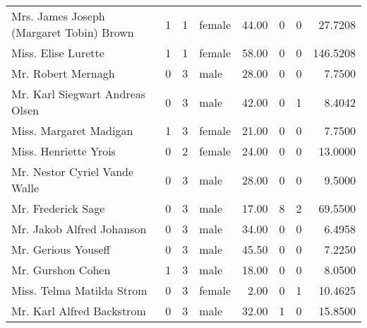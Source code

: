 \begin{tabular}{lrrlrrrr}
Mrs. James Joseph (Margaret Tobin) Brown           &         1 &       1 &  female &  44.00 &                        0 &                        0 &   27.7208 \\
Miss. Elise Lurette                                &         1 &       1 &  female &  58.00 &                        0 &                        0 &  146.5208 \\
Mr. Robert Mernagh                                 &         0 &       3 &    male &  28.00 &                        0 &                        0 &    7.7500 \\
Mr. Karl Siegwart Andreas Olsen                    &         0 &       3 &    male &  42.00 &                        0 &                        1 &    8.4042 \\
Miss. Margaret Madigan                             &         1 &       3 &  female &  21.00 &                        0 &                        0 &    7.7500 \\
Miss. Henriette Yrois                              &         0 &       2 &  female &  24.00 &                        0 &                        0 &   13.0000 \\
Mr. Nestor Cyriel Vande Walle                      &         0 &       3 &    male &  28.00 &                        0 &                        0 &    9.5000 \\
Mr. Frederick Sage                                 &         0 &       3 &    male &  17.00 &                        8 &                        2 &   69.5500 \\
Mr. Jakob Alfred Johanson                          &         0 &       3 &    male &  34.00 &                        0 &                        0 &    6.4958 \\
Mr. Gerious Youseff                                &         0 &       3 &    male &  45.50 &                        0 &                        0 &    7.2250 \\
Mr. Gurshon Cohen                                  &         1 &       3 &    male &  18.00 &                        0 &                        0 &    8.0500 \\
Miss. Telma Matilda Strom                          &         0 &       3 &  female &   2.00 &                        0 &                        1 &   10.4625 \\
Mr. Karl Alfred Backstrom                          &         0 &       3 &    male &  32.00 &                        1 &                        0 &   15.8500 \\

\end{tabular}
